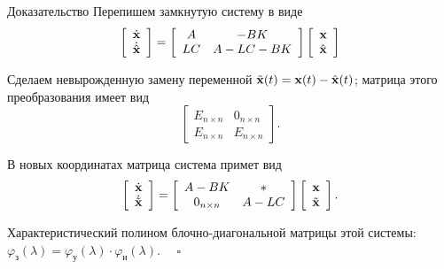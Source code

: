 \documentclass[notheorems,aspectratio=169]{beamer}
\theoremstyle{definition}
\begin{document}
\begin{frame}{Доказательство}
  Перепишем замкнутую систему в виде
  \begin{equation*}
    \left[%
      \begin{array}{c}
        \dot{\vb{x}} \\
        \dot{\hat{\vb{x}}}
      \end{array}
      \right]
    =
    \left[
      \begin{array}{cc}
        A & -BK \\
        LC & A - LC - BK
      \end{array}
      \right]
    \left[
      \begin{array}{c}
        \vb{x} \\
        \hat{\vb{x}}
      \end{array}
      \right]
  \end{equation*}

  Сделаем невырожденную замену переменной $\tilde{\vb{x}}(t) = \vb{x}(t) - \hat{\vb{x}}(t)$; матрица
  этого преобразования имеет вид
  \begin{equation*}
    \left[
      \begin{array}{cc}
        E_{n \times n} & 0_{n \times n} \\
        E_{n \times n} & E_{n \times n}
      \end{array}
      \right].
  \end{equation*}

  В новых координатах матрица система примет вид
  \begin{equation*}
    \left[
      \begin{array}{c}
        \dot{\vb{x}} \\
        \dot{\tilde{\vb{x}}}
      \end{array}
      \right]
    =
    \left[
      \begin{array}{cc}
        A - BK & \ast \\
        0_{n \times n} & A - LC
      \end{array}
      \right]
    \left[
      \begin{array}{c}
        \vb{x} \\
        \tilde{\vb{x}}
      \end{array}
      \right].
  \end{equation*}

  Характеристический полином блочно-диагональной матрицы этой системы: $\varphi_{\text{з}}(\lambda) = \varphi_{\text{у}}(\lambda) \cdot \varphi_{\text{и}}(\lambda)$. $\quad \square$
\end{frame}
\end{document}

